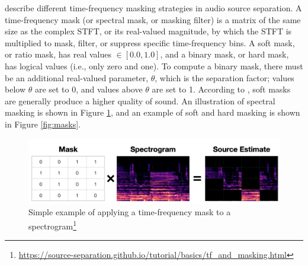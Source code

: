 \documentclass[report.tex]{subfiles}
\begin{document}
\textcite{masking} describe different time-frequency masking strategies in audio source separation. A time-frequency mask (or spectral mask, or masking filter) is a matrix of the same size as the complex STFT, or its real-valued magnitude, by which the STFT is multiplied to mask, filter, or suppress specific time-frequency bins. A soft mask, or ratio mask, has real values $\in [0.0, 1.0]$, and a binary mask, or hard mask, has logical values (i.e., only zero and one). To compute a binary mask, there must be an additional real-valued parameter, $\theta$, which is the separation factor; values below $\theta$ are set to 0, and values above $\theta$ are set to 1. According to \textcite{masking}, soft masks are generally produce a higher quality of sound. An illustration of spectral masking is shown in Figure \ref{fig:simplemasks}, and an example of soft and hard masking is shown in Figure \ref{fig:masks}.

\begin{figure}[ht]
       \centering
        \begin{minipage}{1.\textwidth}
               \renewcommand\footnoterule{} %
               \renewcommand{\thempfootnote}{\fnsymbol{mpfootnote}}
               \includegraphics[width=\textwidth]{./images-mss/mask_simple.png}
		\caption[Simple example of applying a time-frequency mask to a spectrogram]{Simple example of applying a time-frequency mask to a spectrogram\footnote[1]{\url{https://source-separation.github.io/tutorial/basics/tf_and_masking.html}}}
               \label{fig:simplemasks}
       \end{minipage}
\end{figure}
\end{document}
